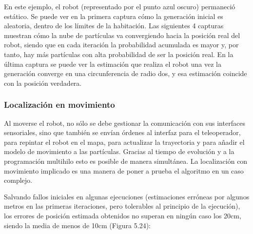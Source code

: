 En este ejemplo, el robot (representado por el punto azul oscuro) permaneció estático. Se puede ver en la primera captura cómo la generación inicial es aleatoria, dentro de los límites de la habitación. Las siguientes 4 capturas muestran cómo la nube de partículas va convergiendo hacia la posición real del robot, siendo que en cada iteración la probabilidad acumulada es mayor y, por tanto, hay más partículas con alta probabilidad de ser la posición real. En la última captura se puede ver la estimación que realiza el robot una vez la generación converge en una circunferencia de radio dos, y esa estimación coincide con la posición verdadera.

\subsubsection{Localización en movimiento}
Al moverse el robot, no sólo se debe gestionar la comunicación con sus interfaces sensoriales, sino que también se envían órdenes al interfaz para el teleoperador, para repintar el robot en el mapa, para actualizar la trayectoria y para añadir el modelo de movimiento a las partículas. Gracias al tiempo de evolución y a la programación multihilo esto es posible de manera simultánea. La localización con movimiento implicado es una manera de poner a prueba el algoritmo en un caso complejo.

Salvando fallos iniciales en algunas ejecuciones (estimaciones erróneas por algunos metros en las primeras iteraciones, pero tolerables al principio de la ejecución), los errores de posición estimada obtenidos no superan en ningún caso los 20cm, siendo la media de menos de 10cm (Figura 5.24):

